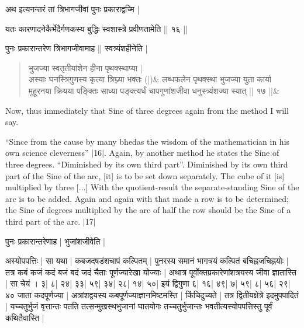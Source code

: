 \documentclass[12pt]{book}
\def\elp{$\ldots$}
\def\danda{$|$}
\begin{document}
\newpage


{\s अथ इत्यनन्तरं तां त्रिभागजीवां पुनः प्रकाराद्वच्मि |}

\vskip15pt
{\s यतः कारणादनेकैर्भेदैर्गणकस्य बुद्धिः स्वशास्त्रे प्रवीणतामेति || १६ ||}

\vskip15pt
{\s पुनः प्रकारान्तरेण त्रिभागजीवामाह || स्वत्र्यंशहीनेति |}

\vskip15pt

\begin{verse}
{\s भुजज्या स्वतृतीयांशेन हीना पृथक्स्थाप्या |\\
अस्याः घनस्त्रिगुणस्य कृत्या त्रिघ्न्या भक्तः (|)}\&
{\s लब्धफलेन पृथक्स्था भुजज्या युता
कार्या \\
मुहूरनया क्रियया पङ्क्तिः साध्या
पङ्क्त्यर्धं चापगुणांशजीवा
धनुस्त्र्यंशज्या स्यात् || १७ ||}\&
\end{verse}
\newpage

Now, thus immediately that Sine of three degrees again from the method I will say.

``Since from the cause by many bhedas the wisdom of the mathematician in 
his own science cleverness'' \danda16\danda. Again, by another method he states the Sine
of three degrees.  ``Diminished by its own third part''. 
Diminished by its own third part of the Sine
of the arc, [it] is to be set down separately.  The cube of it [is] multiplied by three [\elp]
With the quotient-result the separate-standing Sine of the arc is to be added. Again
and again with that made a row is to be determined; the Sine of degrees multiplied
by the arc of half the row should be the Sine of a third part of the arc. \danda17\danda
\newpage 




\vskip15pt
{\s पुनः प्रकारान्तरेणाह | भुजांशजीवेति |}

{\s अस्योपपत्तिः | सा यथा |
कबजदषडंशचापं कल्पितम् | 
पुनरस्य समानं भागत्रयं कल्पितं बचिह्नजचिह्नयोः |
तत्र कबं कजं कदं बजं बदं जदं चैताः
पूर्णज्यारेखा योज्याः |
अथात्र पूर्वोक्तप्रकारेणांशत्रयस्य जीवा ज्ञातास्ति | सा चेयं । 
३| ८| २४| ३३| ५९| ३४| २८| १४| ५०| इयं द्विगुणा
६| १६| ४९| ७| ५९| ८| ५६| २९| ४० जाता कदपूर्णज्या |
अत्रांशद्वयस्य कबपूर्णज्याज्ञानमिष्टमस्ति |
किंचिदुच्यते |
तत्र
द्वितीयक्षेत्रे इदमुपपादितं |
यच्चतुर्भुजं वृत्तान्तः पतति तत्सन्मुखस्थभुजानां घातयोगः
तच्चतुर्भुजान्तः
भवतीत्यस्योपपत्तिस्तु पूर्वं कथितैवास्ति |}
\end{document}
